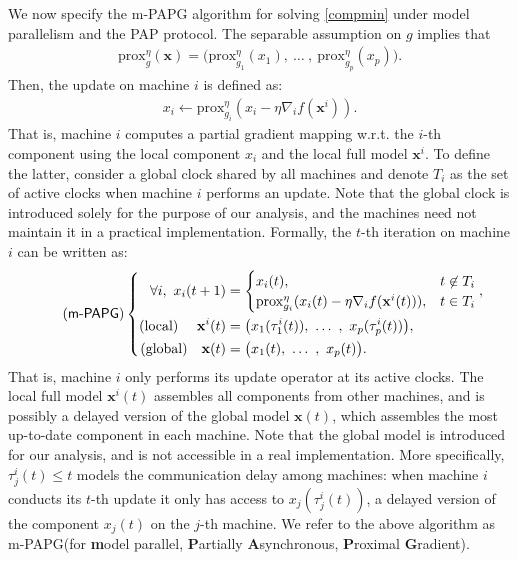 \documentclass[leqno,onefignum,onetabnum]{siamart0516}
\newcommand{\pap}{PAP\xspace}
\newcommand{\wrt}{{w.r.t.}\xspace}
\newcommand{\xb}{\mathbf{x}}
\newcommand{\prox}[2][\eta]{\mathrm{prox}_{#2}^{#1}}
\newcommand{\mspg}{\textsf{m-PAPG}\xspace}
\newcommand{\pred}[1]{[\!\![ {#1} ]\!\!] }
\begin{document}
We now specify the \mspg algorithm for solving \eqref{compmin} under model parallelism and the \pap protocol. The separable assumption on $g$ implies that 
\begin{align}
\prox{g}(\xb) = \big( \prox{g_1}(x_1),~ \ldots~,~ \prox{g_p}(x_p) \big).
\end{align}
Then, the update on machine $i$ is defined as: 
\begin{align}
\label{update_op}
x_i \gets \prox{g_i}(x_i - \eta \nabla_i f(\xb^i)).
\end{align}
That is, machine $i$ computes a partial gradient mapping \cite{Nesterov13} \wrt the $i$-th component using the local component $x_i$ and the local full model $\xb^i$. To define the latter, consider a global clock shared by all machines and denote $T_i$ as the set of active clocks when machine $i$ performs an update. Note that the global clock is introduced solely for the purpose of our analysis, and the machines need not maintain it in a practical implementation.
Formally, the $t$-th iteration on machine $i$ can be written as:
\begin{equation}\label{mspg_formulation}
\tag{\mspg}
\left\{
\begin{aligned}
	\forall i,~
x_i(t+1) &= \begin{cases}
x_i(t), & t \not\in T_i \\
\prox{g_i}(x_i(t) - \eta \nabla_i f(\xb^i(t))), & t \in T_i
\end{cases}
,
\\ 
\mbox{(local) } \quad \xb^i(t) &= \big( x_1(\tau_1^i(t)),~ \ldots~,~ x_p(\tau_p^i(t)) \big),
\\
\mbox{(global)}\quad  \xb(t) &= \big( x_1(t),~ \ldots~,~ x_p(t) \big).
\end{aligned}
\right.
\end{equation}
That is, machine $i$ only performs its update operator at its active clocks. The local full model $\xb^i(t)$ assembles all components from other machines, and is possibly a delayed version of the global model $\xb(t)$, which assembles the most up-to-date component in each machine. Note that the global model is introduced for our analysis, and is not accessible in a real implementation.
More specifically, $\tau_j^i(t) \leq t$ models the communication delay among machines: when machine $i$ conducts its $t$-th update it only has access to  $x_j(\tau_j^i(t))$, a delayed version of the component $x_j(t)$ on the $j$-th machine. We refer to the above algorithm as \mspg (for \textbf{m}odel parallel, \textbf{P}artially \textbf{A}synchronous, \textbf{P}roximal \textbf{G}radient).
\end{document}
